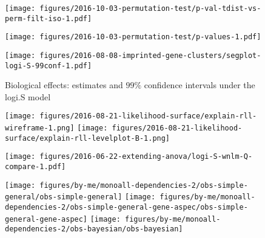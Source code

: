\documentclass[letterpaper]{article}
\begin{document}
\begin{figure}
\begin{center}
\texttt{[image: figures/2016-10-03-permutation-test/p-val-tdist-vs-perm-filt-iso-1.pdf]}
\end{center}
\caption{}
\label{fig:pval-tdist-vs-perm}
\end{figure}

\begin{figure}
\begin{center}
\texttt{[image: figures/2016-10-03-permutation-test/p-values-1.pdf]}
\end{center}
\caption{}
\label{fig:pval}
\end{figure}

\begin{figure}
\begin{center}
\texttt{[image: figures/2016-08-08-imprinted-gene-clusters/segplot-logi-S-99conf-1.pdf]}
\end{center}
\caption{Biological effects: estimates and $99\%$ confidence intervals under
the logi.S model}
\label{fig:biol-effects-logi.S}
\end{figure}

\begin{figure}
\begin{center}
\texttt{[image: figures/2016-08-21-likelihood-surface/explain-rll-wireframe-1.png]}
\texttt{[image: figures/2016-08-21-likelihood-surface/explain-rll-levelplot-B-1.png]}
\end{center}
\caption{}
\label{fig:ll-surf-explain}
\end{figure}

\begin{figure}
\begin{center}
\texttt{[image: figures/2016-06-22-extending-anova/logi-S-wnlm-Q-compare-1.pdf]}
\end{center}
\caption{}
\label{fig:logi.S-wnlm.Q-compare}
\end{figure}

\begin{figure}
\begin{center}
\texttt{[image: figures/by-me/monoall-dependencies-2/obs-simple-general/obs-simple-general]}
\hspace{\fill}
\texttt{[image: figures/by-me/monoall-dependencies-2/obs-simple-general-gene-aspec/obs-simple-general-gene-aspec]}
\hspace{\fill}
\texttt{[image: figures/by-me/monoall-dependencies-2/obs-bayesian/obs-bayesian]}
\end{center}
\caption{}
\label{fig:glm-vs-hierarch}
\end{figure}
\end{document}
